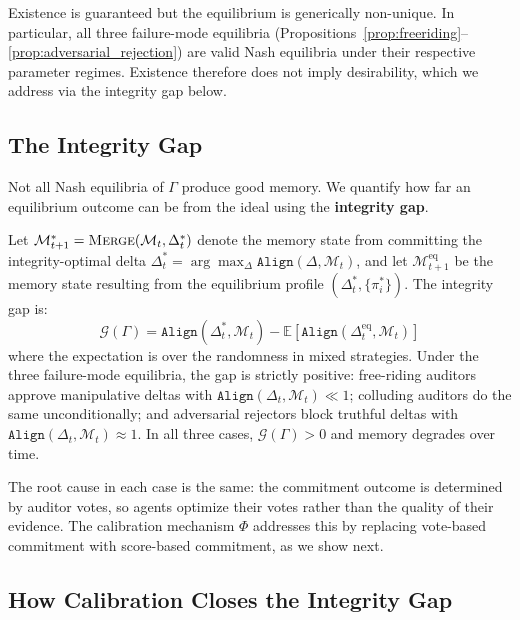 \begin{remark}
Existence is guaranteed but the equilibrium is generically non-unique.
In particular, all three failure-mode equilibria
(Propositions~\ref{prop:freeriding}--\ref{prop:adversarial_rejection})
are valid Nash equilibria under their respective parameter regimes.
Existence therefore does not imply desirability, which we address via
the integrity gap below.
\end{remark}

\subsection{The Integrity Gap}
\label{app:integrity_gap}

Not all Nash equilibria of $\Gamma$ produce good memory. We quantify
how far an equilibrium outcome can be from the ideal using the
\textbf{integrity gap}.

Let $\mathcal{M}^*_{t+1} = \textsc{Merge}(\mathcal{M}_t, \Delta_t^*)$
denote the memory state from committing the integrity-optimal delta
$\Delta_t^* = \arg\max_\Delta \texttt{Align}(\Delta, \mathcal{M}_t)$,
and let $\mathcal{M}^{\text{eq}}_{t+1}$ be the memory state resulting
from the equilibrium profile $(\Delta_t^*, \{\pi_i^*\})$. The
integrity gap is:
\begin{equation}
    \mathcal{G}(\Gamma) =
    \texttt{Align}(\Delta_t^*, \mathcal{M}_t) -
    \mathbb{E}\!\left[
        \texttt{Align}(\Delta_t^{\text{eq}}, \mathcal{M}_t)
    \right]
\end{equation}
where the expectation is over the randomness in mixed strategies. Under
the three failure-mode equilibria, the gap is strictly positive:
free-riding auditors approve manipulative deltas with
$\texttt{Align}(\Delta_t, \mathcal{M}_t) \ll 1$; colluding auditors
do the same unconditionally; and adversarial rejectors block truthful
deltas with $\texttt{Align}(\Delta_t, \mathcal{M}_t) \approx 1$.
In all three cases, $\mathcal{G}(\Gamma) > 0$ and memory degrades
over time.

The root cause in each case is the same: the commitment outcome is
determined by auditor votes, so agents optimize their votes rather than
the quality of their evidence. The calibration mechanism $\Phi$
addresses this by replacing vote-based commitment with score-based
commitment, as we show next.

\subsection{How Calibration Closes the Integrity Gap}
\label{app:gap_closing}

